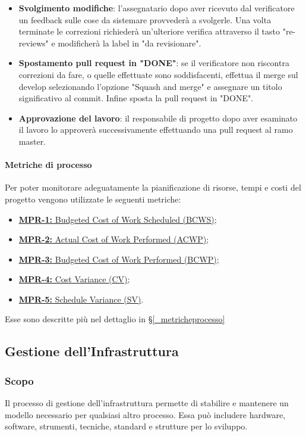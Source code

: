 \begin{itemize}
    \item \textbf{Svolgimento modifiche}: l'assegnatario dopo aver ricevuto dal verificatore un feedback sulle cose da sistemare provvederà a svolgerle. Una volta terminate le correzioni richiederà un'ulteriore verifica attraverso il tasto "re-reviews" e modificherà la label in "da revisionare".
    \item \textbf{Spostamento pull request in "DONE"}: se il verificatore non riscontra correzioni da fare, o quelle effettuate sono soddisfacenti, effettua il merge sul develop selezionando l'opzione "Squash and merge" e assegnare un titolo significativo al commit. Infine sposta la pull request in "DONE".
    \item \textbf{Approvazione del lavoro}: il responsabile di progetto dopo aver esaminato il lavoro lo approverà successivamente effettuando una pull request al ramo master.
\end{itemize}
\paragraph{Metriche di processo}
Per poter monitorare adeguatamente la pianificazione di risorse, tempi e costi del progetto vengono utilizzate le seguenti metriche:
\begin{itemize}
    \item \hyperref[_MPR-1]{\textbf{MPR-1:} Budgeted Cost of Work Scheduled (BCWS)};
    \item \hyperref[_MPR-2]{\textbf{MPR-2:} Actual Cost of Work Performed (ACWP)};
    \item \hyperref[_MPR-3]{\textbf{MPR-3:} Budgeted Cost of Work Performed (BCWP)};
    \item \hyperref[_MPR-4]{\textbf{MPR-4:} Cost Variance (CV)};
    \item \hyperref[_MPR-5]{\textbf{MPR-5:} Schedule Variance (SV)}.
\end{itemize}
Esse sono descritte più nel dettaglio in \S\ref{_metricheprocesso}

\subsection{Gestione dell'Infrastruttura} \label{_gestioneInfrastruttura}
\subsubsection{Scopo}
Il processo di gestione dell’infrastruttura permette di stabilire e mantenere un modello necessario per qualsiasi altro processo. Essa può includere hardware, software, strumenti, tecniche, standard e strutture per lo sviluppo.

